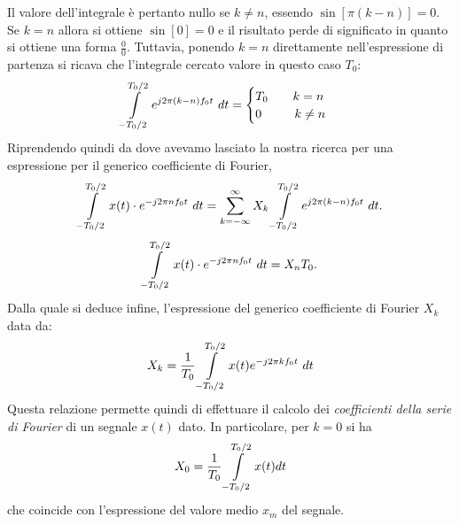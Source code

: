 \documentclass[12pt,oneside,openany]{memoir}
\numberwithin{equation}{subsection}
\newcommand{\dt}{\ dt}
\begin{document}
Il valore dell'integrale \`e pertanto nullo se $k \neq n$, essendo $\sin[\pi (k - n)] = 0$. Se $k = n$ allora si ottiene $\sin[0] = 0$ e il risultato perde di significato in quanto si ottiene una forma $\frac{0}{0}$. Tuttavia, ponendo $k = n$ direttamente nell'espressione di partenza si ricava che l'integrale cercato valore in questo caso $T_0$:
\[
	\int\displaylimits_{-T_0/2}^{T_0/2} e^{j 2 \pi (k - n) f_0 t} \dt =
		\begin{cases}
			T_0 \quad\quad k = n\\
			0 \quad\quad \ \ k \neq n
		\end{cases}
\]
Riprendendo quindi da dove avevamo lasciato la nostra ricerca per una espressione per il generico coefficiente di Fourier,
\[
	\int\displaylimits_{-T_0/2}^{T_0/2} x(t) \cdot e^{-j 2 \pi n f_0 t} \dt = \sum_{k = -\infty}^{\infty} X_k \int\displaylimits_{-T_0/2}^{T_0/2} e^{j 2 \pi (k - n) f_0 t} \dt.
\]
\[
	\int\displaylimits_{-T_0/2}^{T_0/2} x(t) \cdot e^{-j 2 \pi n f_0 t} \dt = X_n T_0.
\]
Dalla quale si deduce infine, l'espressione del generico coefficiente di Fourier $X_k$ data da:
\begin{equation}\label{eq:fourier_coefficient}
	X_k = \frac{1}{T_0} \int\displaylimits_{-T_0/2}^{T_0/2} x(t) e^{-j 2 \pi k f_0 t} \dt
\end{equation}
Questa relazione permette quindi di effettuare il calcolo dei \textit{coefficienti della serie di Fourier} di un segnale $x(t)$ dato. In particolare, per $k = 0$ si ha
\begin{equation}
X_0 = \frac{1}{T_0} \int\displaylimits_{-T_0/2}^{T_0/2} x(t) dt
\end{equation}
che coincide con l'espressione del valore medio $x_m$ del segnale.
\end{document}
